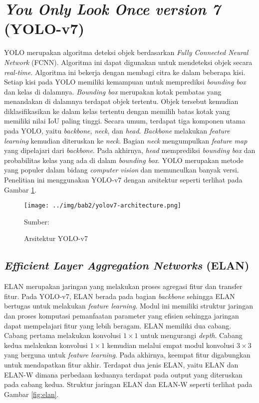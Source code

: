 \section{\textit{You Only Look Once version 7} (YOLO-v7)}
YOLO merupakan algoritma deteksi objek berdasarkan \textit{Fully Connected Neural Network} (FCNN). Algoritma ini dapat digunakan untuk mendeteksi objek secara \textit{real-time}. Algoritma ini bekerja dengan membagi citra ke dalam beberapa kisi. Setiap kisi pada YOLO memiliki kemampuan untuk memprediksi \textit{bounding box} dan kelas di dalamnya. \textit{Bounding box} merupakan kotak pembatas yang menandakan di dalamnya terdapat objek tertentu. Objek tersebut kemudian diklasifikasikan ke dalam kelas tertentu dengan memilih batas kotak yang memiliki nilai IoU paling tinggi. Secara umum, terdapat tiga komponen utama pada YOLO, yaitu \textit{backbone}, \textit{neck}, dan \textit{head}. \textit{Backbone} melakukan \textit{feature learning} kemudian diteruskan ke \textit{neck}. Bagian \textit{neck} mengumpulkan \textit{feature map} yang dipelajari dari \textit{backbone}. Pada akhirnya, \textit{head} memprediksi \textit{bounding box} dan probabilitas kelas yang ada di dalam \textit{bounding box}. YOLO merupakan metode yang populer dalam bidang \textit{computer vision} dan memunculkan banyak versi. Penelitian ini menggunakan YOLO-v7 dengan arsitektur seperti terlihat pada Gambar \ref{fig:yolov7-archi}.
\begin{figure}[H]
    \begin{center}
        \texttt{[image: ../img/bab2/yolov7-architecture.png]}
        \caption{Arsitektur YOLO-v7}
        \label{fig:yolov7-archi}
        Sumber: \citep{Wang2022}
    \end{center}
\end{figure}

    \subsection{\textit{Efficient Layer Aggregation Networks} (ELAN)}
    ELAN merupakan jaringan yang melakukan proses agregasi fitur dan transfer fitur. Pada YOLO-v7, ELAN berada pada bagian \textit{backbone} sehingga ELAN bertugas untuk melakukan \textit{feature learning}. Modul ini memiliki struktur jaringan dan proses komputasi pemanfaatan parameter yang efisien sehingga jaringan dapat mempelajari fitur yang lebih beragam. ELAN memiliki dua cabang. Cabang pertama melakukan konvolusi $1\times 1$ untuk mengurangi \textit{depth}. Cabang kedua melakukan konvolusi $1\times 1$ kemudian melalui empat modul konvolusi $3\times 3$ yang berguna untuk \textit{feature learning}. Pada akhirnya, keempat fitur digabungkan untuk mendapatkan fitur akhir. Terdapat dua jenis ELAN, yaitu ELAN dan ELAN-W dimana perbedaan keduanya terdapat pada output yang diteruskan pada cabang kedua. Struktur jaringan ELAN dan ELAN-W seperti terlihat pada Gambar \ref{fig:elan}.


